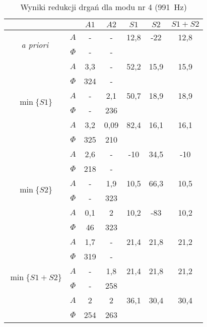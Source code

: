 \documentclass[polish,a4paper,11pt]{mwart}
\begin{document}
  \begin{table}[!tbh]
    \centering
    \caption{Wyniki redukcji drgań dla modu nr 4 (\SI{991}{\hertz})}
    \label{tab:red4}
    \begin{tabular}{|c|c|c|c|c|c|c|}
      \cline{3-7}
      \multicolumn{2}{c|}{}&$A1$&$A2$&$S1$&$S2$&$S1+S2$\\\hline
      \multirow{2}{*}{\textit{a priori}} & $A$ & - & - & 12,8 & -22 & 12,8\\\cline{2-7}
					 & $\Phi$ & - & - & \multicolumn{3}{c}{}\\\hline
      \multirow{6}{*}{$\min\{S1\}$}   &   $A$ & 3,3 & - & 52,2 & 15,9 & 15,9\\\cline{2-7}
				      &$\Phi$ & 324 & - & \multicolumn{3}{c}{}\\\cline{2-7}
				      &   $A$ & - & 2,1 & 50,7 & 18,9 & 18,9\\\cline{2-7}
				      &$\Phi$ & - & 236 & \multicolumn{3}{c}{}\\\cline{2-7}
				      &   $A$ & 3,2 & 0,09 & 82,4 & 16,1 & 16,1\\\cline{2-7}
				      &$\Phi$ & 325 & 210 & \multicolumn{3}{c}{}\\\hline
      \multirow{6}{*}{$\min\{S2\}$}   &   $A$ & 2,6 & - & -10 & 34,5 & -10\\\cline{2-7}
				      &$\Phi$ & 218 & - & \multicolumn{3}{c}{}\\\cline{2-7}
				      &   $A$ & - & 1,9 & 10,5 & 66,3 & 10,5\\\cline{2-7}
				      &$\Phi$ & - & 323 & \multicolumn{3}{c}{}\\\cline{2-7}
				      &   $A$ & 0,1 & 2 & 10,2 & -83 & 10,2\\\cline{2-7}
				      &$\Phi$ & 46 & 323 & \multicolumn{3}{c}{}\\\hline
      \multirow{6}{*}{$\min\{S1+S2\}$}&   $A$ & 1,7 & - & 21,4 & 21,8 & 21,2\\\cline{2-7}
				      &$\Phi$ & 319 & - & \multicolumn{3}{c}{}\\\cline{2-7}
				      &   $A$ & - & 1,8 & 21,4 & 21,8 & 21,2\\\cline{2-7}
				      &$\Phi$ & - & 258 & \multicolumn{3}{c}{}\\\cline{2-7}
				      &   $A$ & 2 & 2 & 36,1 & 30,4 & 30,4\\\cline{2-7}
				      &$\Phi$ & 254 & 263 & \multicolumn{3}{c}{}\\\cline{1-4}
    \end{tabular}
  \end{table}
\end{document}

